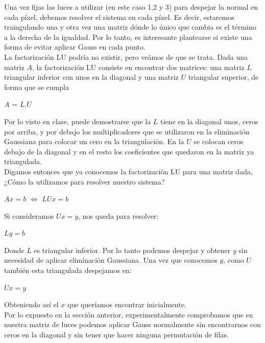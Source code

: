 Una vez fijas las luces a utilizar (en este caso 1,2 y 3) para despejar la normal en cada píxel, debemos resolver el sistema en cada píxel. Es decir, estaremos traingulando una y otra vez una matriz dónde lo único que cambia es el término a la derecha de la igualdad. Por lo tanto, es interesante plantearse si existe una forma de evitar aplicar Gauss en cada punto. \\

La factorización LU podría no existir, pero veámos de que se trata. Dada una matriz $A$, la factorización LU consiste en encontrar dos matrices: una matriz $L$ triangular inferior con unos en la diagonal y una matriz $U$ triangular superior, de forma que se cumpla

\begin{center}
$A$ = $L$.$U$
\end{center}

Por lo visto en clase, puede demostrarse que la $L$ tiene en la diagonal unos, ceros por arriba, y por debajo los multiplicadores que se utilizaron en la eliminación Gaussiana para colocar un cero en la triangulación. En la $U$ se colocan ceros debajo de la diagonal y en el resto los coeficientes que quedaron en la matriz ya triangulada. \\

Digamos entonces que ya conocemos la factorización LU para una matriz dada, ¿Cómo la utilizamos para resolver nuestro sistema?

\begin{center}
    $Ax = b$ $\iff$ $LUx = b$
\end{center}

Si consideramos $Ux = y$, nos queda para resolver:

\begin{center}
    $Ly = b$
\end{center}

Donde $L$ es triangular inferior. Por lo tanto podemos despejar y obtener $y$ sin necesidad de aplicar eliminación Gaussiana. Una vez que conocemos $y$, como $U$ también esta triangulada despejamos en:

\begin{center}
    $Ux = y$
\end{center}

Obteniendo así el $x$ que queríamos encontrar inicialmente. \\

Por lo expuesto en la sección anterior, experimentalmente comprobamos que en nuestra matriz de luces podemos aplicar Gauss normalmente sin encontrarnos con ceros en la diagonal y sin tener que hacer ninguna permutación de filas. \\

